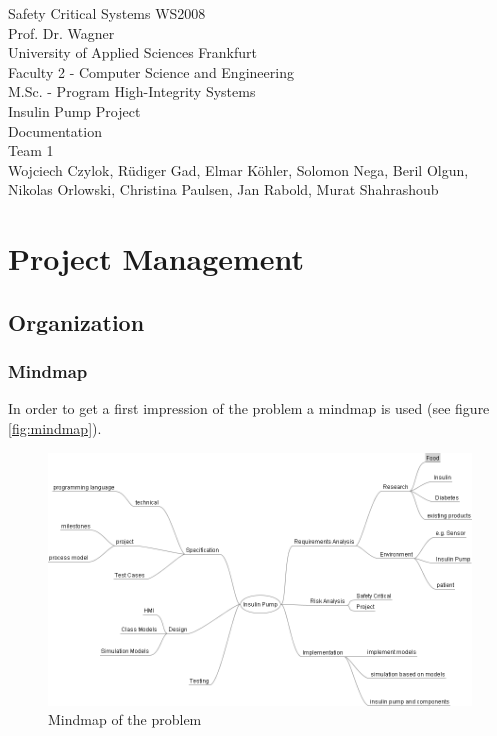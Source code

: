 \documentclass[pdflatex,a4paper,11pt,english]{scrreprt}
\begin{document}
\begin{titlepage}
\vspace*{4cm}
\begin{center}
\Large
Safety Critical Systems WS2008\\
Prof. Dr. Wagner\\
\vspace{4cm}
\normalsize
University of Applied Sciences Frankfurt\\
Faculty 2 - Computer Science and Engineering\\
M.Sc. - Program High-Integrity Systems\\
\vspace{2cm}
Insulin Pump Project\\
Documentation\\
Team 1\\
\vspace{2cm}
Wojciech Czylok, R\"udiger Gad, Elmar K\"ohler, Solomon Nega, Beril Olgun,\\
Nikolas Orlowski, Christina Paulsen, Jan Rabold, Murat Shahrashoub
\end{center}
\end{titlepage}

\tableofcontents

\listoffigures


\newpage
\chapter{Project Management}
\section{Organization}

\subsection{Mindmap}
In order to get a first impression of the problem a mindmap is used (see
figure \vref{fig:mindmap}).

\begin{figure}[htb]
\centering
\includegraphics[width=\textwidth]{images/Insulin_Pump_Mindmap}
\caption{Mindmap of the problem}
\label{fig:mindmap}
\end{figure}
\end{document}
